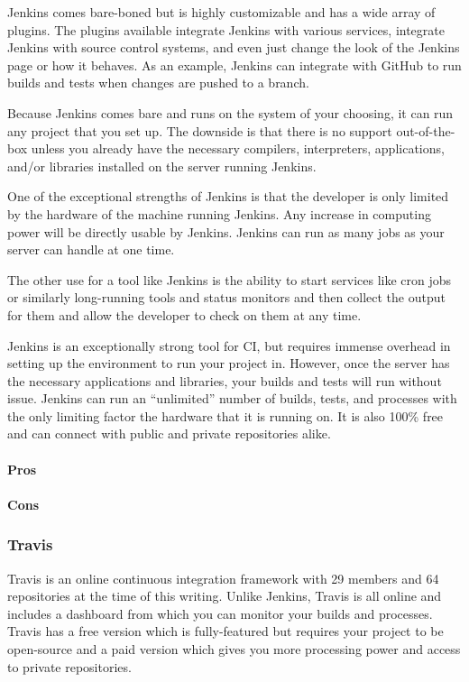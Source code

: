 \documentclass[11pt]{article}
\begin{document}
Jenkins comes bare-boned but is highly customizable and has a wide array of plugins. The plugins available integrate Jenkins with various services, integrate Jenkins with source control systems, and even just change the look of the Jenkins page or how it behaves. As an example, Jenkins can integrate with GitHub to run builds and tests when changes are pushed to a branch.

Because Jenkins comes bare and runs on the system of your choosing, it can run any project that you set up. The downside is that there is no support out-of-the-box unless you already have the necessary compilers, interpreters, applications, and/or libraries installed on the server running Jenkins.

One of the exceptional strengths of Jenkins is that the developer is only limited by the hardware of the machine running Jenkins. Any increase in computing power will be directly usable by Jenkins. Jenkins can run as many jobs as your server can handle at one time.

The other use for a tool like Jenkins is the ability to start services like cron jobs or similarly long-running tools and status monitors and then collect the output for them and allow the developer to check on them at any time.

Jenkins is an exceptionally strong tool for CI, but requires immense overhead in setting up the environment to run your project in. However, once the server has the necessary applications and libraries, your builds and tests will run without issue. Jenkins can run an ``unlimited'' number of builds, tests, and processes with the only limiting factor the hardware that it is running on. It is also 100\% free and can connect with public and private repositories alike.

\paragraph{Pros}

\paragraph{Cons}

\subsubsection{Travis \cite{Travis}}
Travis is an online continuous integration framework with 29 members and 64 repositories at the time of this writing. Unlike Jenkins, Travis is all online and includes a dashboard from which you can monitor your builds and processes. Travis has a free version which is fully-featured but requires your project to be open-source and a paid version which gives you more processing power and access to private repositories.
\end{document}
